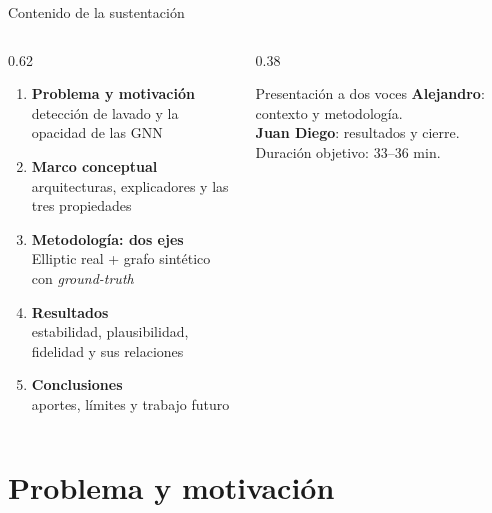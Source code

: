 \documentclass[aspectratio=169,11pt]{beamer}
\begin{document}
\begin{frame}{Contenido de la sustentación}
\vspace{2pt}
\begin{columns}[T]
\begin{column}{0.62\textwidth}
\begin{enumerate}
  \item[\textcolor{teal}{\textbf{1}}] \textbf{Problema y motivación}\\ {\small\color{muted}detección de lavado y la opacidad de las GNN}
  \item[\textcolor{teal}{\textbf{2}}] \textbf{Marco conceptual}\\ {\small\color{muted}arquitecturas, explicadores y las tres propiedades}
  \item[\textcolor{teal}{\textbf{3}}] \textbf{Metodología: dos ejes}\\ {\small\color{muted}Elliptic real + grafo sintético con \textit{ground-truth}}
  \item[\textcolor{teal}{\textbf{4}}] \textbf{Resultados}\\ {\small\color{muted}estabilidad, plausibilidad, fidelidad y sus relaciones}
  \item[\textcolor{teal}{\textbf{5}}] \textbf{Conclusiones}\\ {\small\color{muted}aportes, límites y trabajo futuro}
\end{enumerate}
\end{column}
\begin{column}{0.38\textwidth}
\begin{block}{Presentación a dos voces}
\footnotesize
\textbf{Alejandro}: contexto y metodología.\\[3pt]
\textbf{Juan Diego}: resultados y cierre.\\[6pt]
Duración objetivo: 33--36 min.
\end{block}
\end{column}
\end{columns}
\end{frame}

\section{Problema y motivación}
\end{document}
